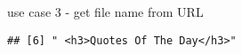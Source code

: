 \documentclass[ignorenonframetext,]{beamer}
\begin{document}
\begin{frame}[fragile]{use case 3 - get file name from URL}
\begin{verbatim}
## [6] " <h3>Quotes Of The Day</h3>"                                                                                                                                                                                                                                                                                                                                                                                                                                                                                                                                                                                                                                                                                                                                                                                                                                                                                                                                                                                                                                                                                                                                                                                                                                                                                                                                                                                                                                                                                                                                                                                                                                                                                                                                                                                                                                                                                                                                                                                                                                   

\end{verbatim}
\end{frame}
\end{document}
